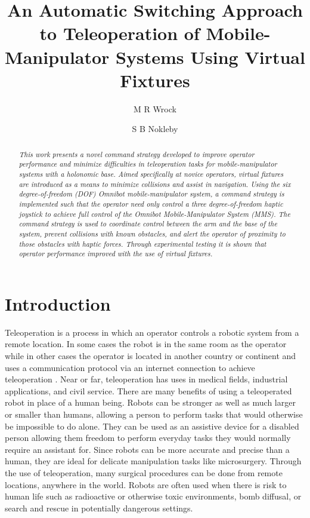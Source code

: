 \documentclass[onecolumn,10pt,final]{asme2ej}
\title{An Automatic Switching Approach to Teleoperation of Mobile-Manipulator Systems Using Virtual Fixtures}
\author{M R Wrock
    \affiliation{
	Mechatronic and Robotic Systems Laboratory\\
	University of Ontario: Institute of Technology\\
	Oshawa, Canada\\
    Email: michael.wrock@uoit.ca
    }	
}
\author{S B Nokleby \\
    \affiliation{
	Mechatronic and Robotic Systems Laboratory\\
	University of Ontario: Institute of Technology\\
	Oshawa, Canada\\
    Email: scott.nokleby@uoit.ca
    }
}
\begin{document}
\maketitle    

\begin{abstract}
{\it This work presents a novel command strategy developed to improve operator performance and minimize difficulties in teleoperation tasks for mobile-manipulator systems with a holonomic base. Aimed specifically at novice operators, virtual fixtures are introduced as a means to minimize collisions and assist in navigation. Using the six degree-of-freedom (DOF) Omnibot mobile-manipulator system, a command strategy is implemented such that the operator need only control a three degree-of-freedom haptic joystick to achieve full control of the Omnibot Mobile-Manipulator System (MMS). The command strategy is used to coordinate control between the arm and the base of the system, prevent collisions with known obstacles, and alert the operator of proximity to those obstacles with haptic forces. Through experimental testing it is shown that operator performance improved with the use of virtual fixtures.
}
\end{abstract}


\section{Introduction}
\label{sec:theothersection}
Teleoperation is a process in which an operator controls a robotic system from a remote location. In some cases the robot is in the same room as the operator while in other cases the operator is located in another country or continent and uses a communication protocol via an internet connection to achieve teleoperation  \cite{WangD}. Near or far, teleoperation has uses in medical fields\cite{Diy}, industrial applications\cite{Diy2}, and civil service\cite{kron}. There are many benefits of using a teleoperated robot in place of a human being. Robots can be stronger as well as much larger or smaller than humans, allowing a person to perform tasks that would otherwise be impossible to do alone\cite{j}. They can be used as an assistive device for a disabled person allowing them freedom to perform everyday tasks they would normally require an assistant for\cite{Palankar}. Since robots can be more accurate and precise than a human, they are ideal for delicate manipulation tasks like microsurgery\cite{melch}. Through the use of teleoperation, many surgical procedures can be done from remote locations, anywhere in the world\cite{Diy3}. Robots are often used when there is risk to human life such as radioactive or otherwise toxic environments, bomb diffusal, or search and rescue in potentially dangerous settings.\\
\end{document}
